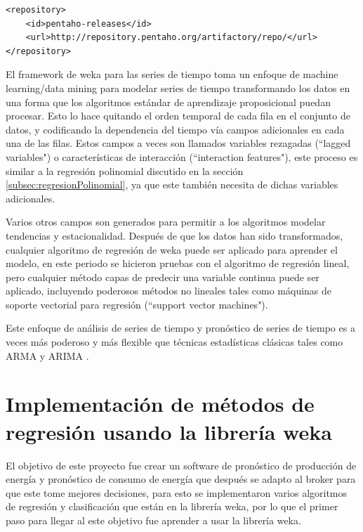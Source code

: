 \begin{lstlisting}[frame=single] 
<repository>
	<id>pentaho-releases</id>
	<url>http://repository.pentaho.org/artifactory/repo/</url>
</repository>
\end{lstlisting}
El framework de weka para las series de tiempo toma un enfoque de machine learning/data mining para modelar series de tiempo transformando los datos en una forma que los algoritmos estándar de aprendizaje proposicional puedan procesar. Esto lo hace quitando el orden temporal de cada fila en el conjunto de datos, y codificando la dependencia del tiempo vía campos adicionales en cada una de las filas. 
Estos campos a veces son llamados variables rezagadas (``lagged variables") o características de interacción (``interaction features"), este proceso es similar a la regresión polinomial discutido en la sección \ref{subsec:regresionPolinomial}, ya que este también necesita de dichas variables adicionales. 

Varios otros campos son generados para permitir a los algoritmos modelar tendencias y estacionalidad. 
Después de que los datos han sido transformados, cualquier algoritmo de regresión de weka puede ser aplicado para aprender el modelo, en este periodo se hicieron pruebas con el algoritmo de regresión lineal, pero cualquier método capas de predecir una variable continua puede ser aplicado, incluyendo poderosos métodos no lineales tales como  máquinas de soporte vectorial para regresión (``support vector machines"). 

Este enfoque de análisis de series de tiempo y pronóstico de series de tiempo es a veces más poderoso y más flexible que técnicas estadísticas clásicas  tales como ARMA y ARIMA \cite{pentaho}.

\section{Implementación de métodos de regresión usando la librería weka}

El objetivo de este proyecto fue crear un software de pronóstico de producción de energía y pronóstico de consumo de energía que después se adapto al broker para que este tome mejores decisiones, para esto se implementaron varios algoritmos de regresión y clasificación que están en la librería weka, por lo que el primer paso para llegar al este objetivo fue aprender a usar la librería weka.

